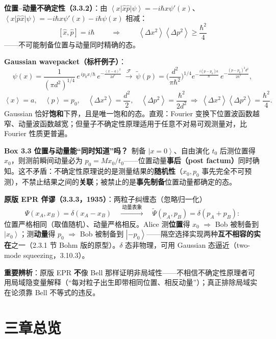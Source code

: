 \documentclass[11pt]{ctexart}
\newcommand{\ket}[1]{\left|#1\right\rangle}
\newcommand{\bra}[1]{\left\langle#1\right|}
\newcommand{\ev}[1]{\left\langle#1\right\rangle}
\newcommand{\op}[1]{\hat{#1}}
\begin{document}
\textbf{位置--动量不确定性（3.3.2）}：由 $\bra x\op x\op p\ket\psi=-i\hbar x\psi'(x)$、$\bra x\op p\op x\ket\psi=-i\hbar x\psi'(x)-i\hbar\psi(x)$ 相减：
\[
\boxed{\;[\op x,\op p]=i\hbar\;}
\qquad\Longrightarrow\qquad
\boxed{\;\ev{\Delta x^2}\ev{\Delta p^2}\ge\frac{\hbar^2}{4}\;}
\]
——不可能制备位置与动量同时精确的态。

\textbf{Gaussian wavepacket（标杆例子）}：
\[
\psi(x)=\frac{1}{(\pi d^2)^{1/4}}\,e^{\,ip_0x/\hbar}\,e^{-\frac{(x-a)^2}{2d^2}}
\ \xrightarrow{\ \mathcal F\ }\
\tilde\psi(p)=\Big(\frac{d^2}{\pi\hbar^2}\Big)^{1/4}e^{-\frac{i(p-p_0)a}{\hbar}}\,e^{-\frac{(p-p_0)^2d^2}{2\hbar^2}},
\]
\[
\ev x=a,\quad\ev p=p_0,\quad\ev{\Delta x^2}=\frac{d^2}{2},\quad\ev{\Delta p^2}=\frac{\hbar^2}{2d^2}
\ \Rightarrow\ \ev{\Delta x^2}\ev{\Delta p^2}=\frac{\hbar^2}{4}.
\]
Gaussian 恰好\textbf{饱和}下界，且是唯一饱和的态。直观：Fourier 变换下位置波函数越窄、动量波函数越宽；但量子不确定性原理适用于任意不对易可观测量对，比 Fourier 性质更普遍。

\textbf{Box 3.3 位置与动量能``同时知道''吗？}\ 制备 $\ket{x=0}$、自由演化 $t_0$ 后测位置得 $x_0$，则测前瞬间动量必为 $p_0=Mx_0/t_0$——位置动量\textbf{事后（post factum）}同时确知。这不矛盾：不确定性原理说的是测量结果的\textbf{随机性}（$x_0,p_0$ 事先完全不可预测），不禁止结果之间的\textbf{关联}；被禁止的是\textbf{事先制备}位置动量都确定的态。

\textbf{原版 EPR 佯谬（3.3.3，1935）}：两粒子纠缠态（忽略归一化）
\[
\Psi(x_A,x_B)=\delta(x_A-x_B)
\quad\xrightarrow{\ \text{动量表象}\ }\quad
\tilde\Psi(p_A,p_B)=\delta(p_A+p_B):
\]
位置严格相同（取值随机）、动量严格相反。Alice 测\textbf{位置}得 $x_0$ $\Rightarrow$ Bob 被制备到 $\ket{x_0}$；测\textbf{动量}得 $p_0$ $\Rightarrow$ Bob 被制备到 $\ket{-p_0}$——隔空选择实现两种\textbf{互不相容的实在}之一（2.3.1 节 Bohm 版的原型）。$\delta$ 态非物理，可用 Gaussian 态逼近（two-mode squeezing，3.10.3）。

\textbf{重要辨析}：原版 EPR \textbf{不}像 Bell 那样证明非局域性——不相信不确定性原理者可用局域隐变量解释（``每对粒子出生即带相同位置、相反动量''）；真正排除局域实在论须靠 Bell 不等式的违反。

\section*{三章总览}
\end{document}
